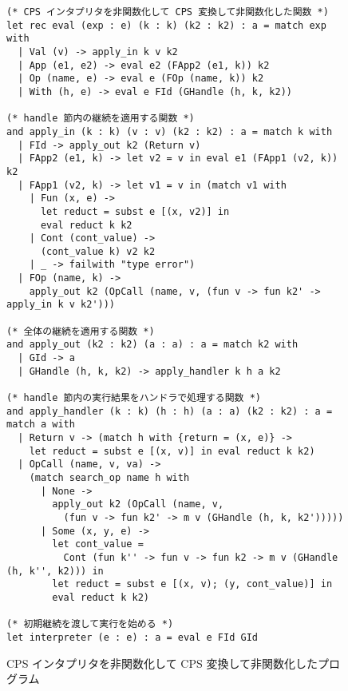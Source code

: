 \begin{figure}
  \begin{spacing}{0.8}
\begin{verbatim}
(* CPS インタプリタを非関数化して CPS 変換して非関数化した関数 *)
let rec eval (exp : e) (k : k) (k2 : k2) : a = match exp with
  | Val (v) -> apply_in k v k2
  | App (e1, e2) -> eval e2 (FApp2 (e1, k)) k2
  | Op (name, e) -> eval e (FOp (name, k)) k2
  | With (h, e) -> eval e FId (GHandle (h, k, k2))

(* handle 節内の継続を適用する関数 *)
and apply_in (k : k) (v : v) (k2 : k2) : a = match k with
  | FId -> apply_out k2 (Return v)
  | FApp2 (e1, k) -> let v2 = v in eval e1 (FApp1 (v2, k)) k2
  | FApp1 (v2, k) -> let v1 = v in (match v1 with
    | Fun (x, e) ->
      let reduct = subst e [(x, v2)] in
      eval reduct k k2
    | Cont (cont_value) ->
      (cont_value k) v2 k2
    | _ -> failwith "type error")
  | FOp (name, k) ->
    apply_out k2 (OpCall (name, v, (fun v -> fun k2' -> apply_in k v k2')))

(* 全体の継続を適用する関数 *)
and apply_out (k2 : k2) (a : a) : a = match k2 with
  | GId -> a
  | GHandle (h, k, k2) -> apply_handler k h a k2

(* handle 節内の実行結果をハンドラで処理する関数 *)
and apply_handler (k : k) (h : h) (a : a) (k2 : k2) : a = match a with
  | Return v -> (match h with {return = (x, e)} ->
    let reduct = subst e [(x, v)] in eval reduct k k2)
  | OpCall (name, v, va) ->
    (match search_op name h with
      | None ->
        apply_out k2 (OpCall (name, v,
          (fun v -> fun k2' -> m v (GHandle (h, k, k2')))))
      | Some (x, y, e) ->
        let cont_value =
          Cont (fun k'' -> fun v -> fun k2 -> m v (GHandle (h, k'', k2))) in
        let reduct = subst e [(x, v); (y, cont_value)] in
        eval reduct k k2)

(* 初期継続を渡して実行を始める *)
let interpreter (e : e) : a = eval e FId GId
\end{verbatim}
\end{spacing}
\caption{CPS インタプリタを非関数化して CPS 変換して非関数化したプログラム}
\label{figure:4defun}
\end{figure}

